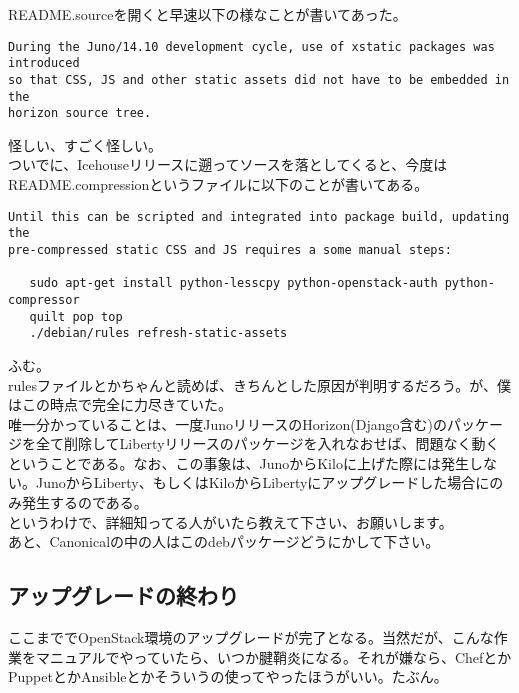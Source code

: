 \documentclass[9pt,b5paper,tombo,openany]{jsbook}
\begin{document}
\noindent
README.sourceを開くと早速以下の様なことが書いてあった。

\begin{lstlisting}
During the Juno/14.10 development cycle, use of xstatic packages was introduced
so that CSS, JS and other static assets did not have to be embedded in the
horizon source tree.
\end{lstlisting}

\noindent
怪しい、すごく怪しい。\\[1ex]

ついでに、Icehouseリリースに遡ってソースを落としてくると、今度はREADME.compressionというファイルに以下のことが書いてある。

\begin{lstlisting}
Until this can be scripted and integrated into package build, updating the
pre-compressed static CSS and JS requires a some manual steps:

   sudo apt-get install python-lesscpy python-openstack-auth python-compressor
   quilt pop top
   ./debian/rules refresh-static-assets
\end{lstlisting}

\noindent
ふむ。\\[1ex]

rulesファイルとかちゃんと読めば、きちんとした原因が判明するだろう。が、僕はこの時点で完全に力尽きていた。\\[1ex]

唯一分かっていることは、一度JunoリリースのHorizon(Django含む)のパッケージを全て削除してLibertyリリースのパッケージを入れなおせば、問題なく動くということである。なお、この事象は、JunoからKiloに上げた際には発生しない。JunoからLiberty、もしくはKiloからLibertyにアップグレードした場合にのみ発生するのである。\\[1ex]

\noindent
というわけで、詳細知ってる人がいたら教えて下さい、お願いします。\\[1ex]

\noindent
あと、Canonicalの中の人はこのdebパッケージどうにかして下さい。\\[1ex]

\subsection{アップグレードの終わり}
ここまででOpenStack環境のアップグレードが完了となる。当然だが、こんな作業をマニュアルでやっていたら、いつか腱鞘炎になる。それが嫌なら、ChefとかPuppetとかAnsibleとかそういうの使ってやったほうがいい。たぶん。\\[1ex]
\end{document}
